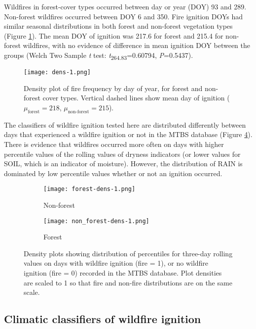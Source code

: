 \documentclass[11p]{article}
\begin{document}
Wildfires in forest-cover types occurred between day or year (DOY) 93 and 289. Non-forest wildfires occurred between DOY 6 and 350. Fire ignition DOYs had similar seasonal distributions in both forest and non-forest vegetation types (Figure \ref{fig:fire-dens}). The mean DOY of ignition was 217.6 for forest and 215.4 for non-forest wildfires, with no evidence of difference in mean ignition DOY between the groups (Welch Two Sample \textit{t} test: \textit{t}\textsubscript{264.83}=0.60794, \textit{P}=0.5437).

\begin{figure}[htbp]
  \texttt{[image: dens-1.png]}
  \caption{Density plot of fire frequency by day of year, for forest and non-forest cover types. Vertical dashed lines show mean day of ignition ($\mu_{\text{forest}} = 218$, $\mu_{\text{non-forest}} = 215$).}
  \label{fig:fire-dens}
\end{figure}

The classifiers of wildfire ignition tested here are distributed differently between days that experienced a wildfire ignition or not in the MTBS database (Figure \ref{fig:dens}). There is evidence that wildfires occurred more often on days with higher percentile values of the rolling values of dryness indicators (or lower values for SOIL, which is an indicator of moisture). However, the distribution of RAIN is dominated by low percentile values whether or not an ignition occurred.  

\begin{figure}[htbp]
  \centering
  \begin{subfigure}{.5\textwidth}
    \centering
    \texttt{[image: forest-dens-1.png]}
    \caption{Non-forest}
    \label{fig:dens-nf}
  \end{subfigure}%
  \begin{subfigure}{.5\textwidth}
    \centering
    \texttt{[image: non\_forest-dens-1.png]}
    \caption{Forest}
    \label{fig:dens-f}
  \end{subfigure}
  \caption{Density plots showing distribution of percentiles for three-day rolling values on days with wildfire ignition (fire = 1), or no wildfire ignition (fire = 0) recorded in the MTBS database. Plot densities are scaled to 1 so that fire and non-fire distributions are on the same scale.}
  \label{fig:dens}
\end{figure}

\subsection{Climatic classifiers of wildfire ignition}
\end{document}

